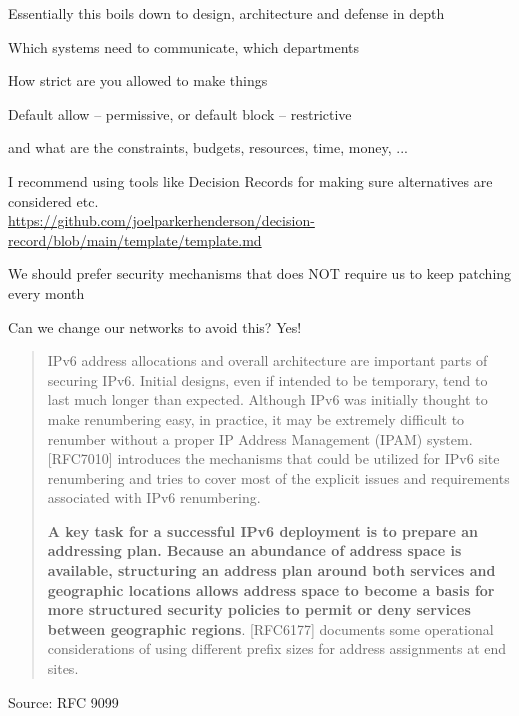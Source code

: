 \documentclass[Screen16to9,17pt]{foils}
\begin{document}
Essentially this boils down to design, architecture and defense in depth



\begin{list2}
\item Which systems need to communicate, which departments
\item How strict are you allowed to make things
\item Default allow -- permissive, or default block -- restrictive
\item and what are the constraints, budgets, resources, time, money, ...
\item I recommend using tools like Decision Records for making sure alternatives are considered etc.\\
\url{https://github.com/joelparkerhenderson/decision-record/blob/main/template/template.md}
\end{list2}







\begin{list2}
\item We should prefer security mechanisms that does NOT require us to keep patching every month
\item Can we change our networks to avoid this? Yes!
\end{list2}





\begin{quote}
IPv6 address allocations and overall architecture are important parts
of securing IPv6.  Initial designs, even if intended to be temporary,
tend to last much longer than expected.  Although IPv6 was initially
thought to make renumbering easy, in practice, it may be extremely
difficult to renumber without a proper IP Address Management (IPAM)
system.  [RFC7010] introduces the mechanisms that could be utilized
for IPv6 site renumbering and tries to cover most of the explicit
issues and requirements associated with IPv6 renumbering.

{\bf A key task for a successful IPv6 deployment is to prepare an
addressing plan.  Because an abundance of address space is available,
structuring an address plan around both services and geographic
locations allows address space to become a basis for more structured
security policies to permit or deny services between geographic
regions}.  [RFC6177] documents some operational considerations of
using different prefix sizes for address assignments at end sites.
\end{quote}
Source: RFC 9099
\end{document}
